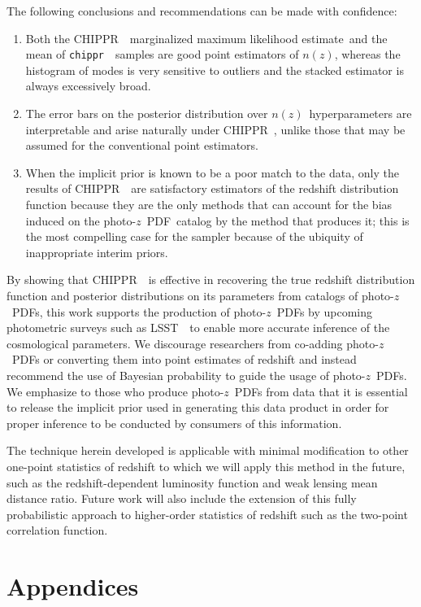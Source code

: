 \documentclass[iop]{emulateapj}
\newcommand{\project}[1]{{\textsc{#1}}~}
\newcommand{\lsst}{\project{LSST}}
\newcommand{\Chippr}{\project{CHIPPR}}
\newcommand{\repo}[1]{{\texttt{#1}}~}
\newcommand{\chippr}{\repo{chippr}}
\newcommand{\nz}{$n(z)$}
\newcommand{\pz}{photo-$z$~}
\newcommand{\pzpdf}{\pz PDF}
\newcommand{\mmle}{marginalized maximum likelihood estimate}
\begin{document}
The following conclusions and recommendations can be made with confidence:

\begin{enumerate}
	\item Both the \Chippr\ \mmle\ and the mean of \chippr\ samples are 
good point estimators of \nz, whereas the histogram of modes is very sensitive 
to outliers and the stacked estimator is always excessively broad.
	\item The error bars on the posterior distribution over \nz\ 
hyperparameters are interpretable and arise naturally under \Chippr, unlike 
those that may be assumed for the conventional point estimators.
	\item When the implicit prior is known to be a poor match to the data, 
only the results of \Chippr\ are satisfactory estimators of the redshift 
distribution function because they are the only methods that can account for 
the bias induced on the \pzpdf\ catalog by the method that produces it; this is 
the most compelling case for the sampler because of the ubiquity of 
inappropriate interim priors.
\end{enumerate}

By showing that \Chippr\ is effective in recovering the true redshift 
distribution function and posterior distributions on its parameters from 
catalogs of \pzpdf s, this work supports the production of \pzpdf s by upcoming 
photometric surveys such as \lsst\ to enable more accurate inference of the 
cosmological parameters.  
We discourage researchers from co-adding \pzpdf s or converting them into point 
estimates of redshift and instead recommend the use of Bayesian probability to 
guide the usage of \pzpdf s.  
We emphasize to those who produce \pzpdf s from data that it is essential to 
release the implicit prior used in generating this data product in order for 
proper inference to be conducted by consumers of this information.

The technique herein developed is applicable with minimal modification to other 
one-point statistics of redshift to which we will apply this method in the 
future, such as the redshift-dependent luminosity function and weak lensing 
mean distance ratio.  
Future work will also include the extension of this fully probabilistic 
approach to higher-order statistics of redshift such as the two-point 
correlation function.

\section*{Appendices}
\end{document}
